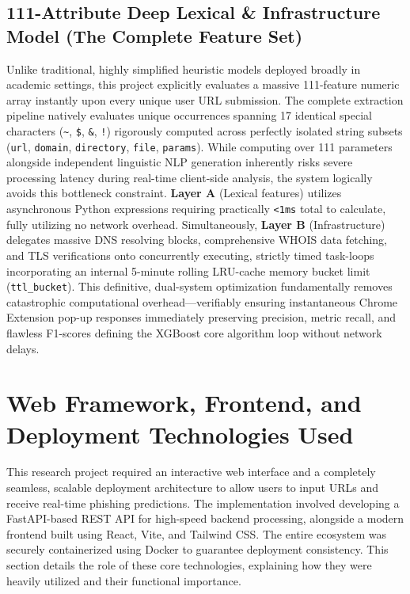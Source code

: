 \subsection{111-Attribute Deep Lexical \& Infrastructure Model (The Complete Feature Set)}
\noindent
Unlike traditional, highly simplified heuristic models deployed broadly in academic settings, this project explicitly evaluates a massive 111-feature numeric array instantly upon every unique user URL submission. The complete extraction pipeline natively evaluates unique occurrences spanning 17 identical special characters (\texttt{\~{}}, \texttt{\$}, \texttt{\&}, \texttt{!}) rigorously computed across perfectly isolated string subsets (\texttt{url}, \texttt{domain}, \texttt{directory}, \texttt{file}, \texttt{params}).
\noindent
While computing over 111 parameters alongside independent linguistic NLP generation inherently risks severe processing latency during real-time client-side analysis, the system logically avoids this bottleneck constraint. \textbf{Layer A} (Lexical features) utilizes asynchronous Python expressions requiring practically \texttt{<1ms} total to calculate, fully utilizing no network overhead. Simultaneously, \textbf{Layer B} (Infrastructure) delegates massive DNS resolving blocks, comprehensive WHOIS data fetching, and TLS verifications onto concurrently executing, strictly timed task-loops incorporating an internal 5-minute rolling LRU-cache memory bucket limit (\texttt{ttl\_bucket}). This definitive, dual-system optimization fundamentally removes catastrophic computational overhead---verifiably ensuring instantaneous Chrome Extension pop-up responses immediately preserving precision, metric recall, and flawless F1-scores defining the XGBoost core algorithm loop without network delays.

\section{Web Framework, Frontend, and Deployment Technologies Used}

This research project required an interactive web interface and a completely seamless, scalable deployment architecture to allow users to input URLs and receive real-time phishing predictions. The implementation involved developing a FastAPI-based REST API for high-speed backend processing, alongside a modern frontend built using React, Vite, and Tailwind CSS. The entire ecosystem was securely containerized using Docker to guarantee deployment consistency. This section details the role of these core technologies, explaining how they were heavily utilized and their functional importance.

